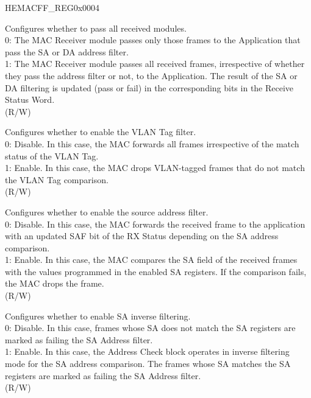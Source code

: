 \begin{register}{H}{EMACFF\_REG}{0x0004}\label{regdesc:EMACFFREG}
%
%
%
%
%
%
%
%
%
%
%
%
\regnewline%
\begin{regdesc}\begin{reglist}
\item [RECEIVE\_ALL] Configures whether to pass all received modules.\\
0: The MAC Receiver module passes only those frames to the Application that pass the SA or DA address filter.\\
1: The MAC Receiver module passes all received frames, irrespective of whether they pass the address filter or not, to the Application. The result of the SA or DA filtering is updated (pass or fail) in the corresponding bits in the Receive Status Word.\\(R/W)
\item [VTFE] Configures whether to enable the VLAN Tag filter. \\
0: Disable. In this case, the MAC forwards all frames irrespective of the match status of the VLAN Tag.\\
1: Enable. In this case, the MAC drops VLAN-tagged frames that do not match the VLAN Tag comparison.\\
(R/W)
\item [SAFE] Configures whether to enable the source address filter.\\
0: Disable. In this case, the MAC forwards the received frame to the application with an updated SAF bit of the RX Status depending on the SA address comparison.\\
1: Enable. In this case, the MAC compares the SA field of the received frames with the values programmed in the enabled SA registers. If the comparison fails, the MAC drops the frame.\\(R/W)
\item [SAIF] Configures whether to enable SA inverse filtering.\\
0: Disable. In this case, frames whose SA does not match the SA registers are marked as failing the SA Address filter.\\
1: Enable. In this case, the Address Check block operates in inverse filtering mode for the SA address comparison. The frames whose SA matches the SA registers are marked as failing the SA Address filter.\\(R/W)

\item[Continued on the next page...]
\end{reglist}\end{regdesc}
\end{register}

